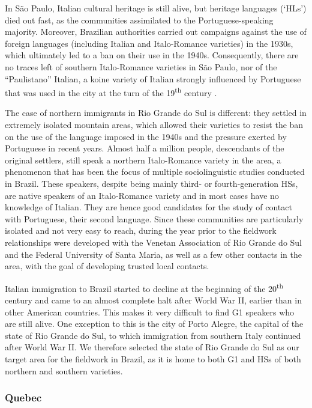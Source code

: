 \documentclass[output=paper,hidelinks]{langscibook}
\begin{document}
In São Paulo, Italian cultural heritage is still alive, but heritage languages (`HLs') died out fast, as the communities assimilated to the Portuguese-speaking majority. Moreover, Brazilian authorities carried out campaigns against the use of foreign languages (including Italian and Italo-Romance varieties) in the 1930s, which ultimately led to a ban on their use in the 1940s. Consequently, there are no traces left of southern Italo-Romance varieties in São Paulo, nor of the ``Paulistano'' Italian, a koine variety of Italian strongly influenced by Portuguese that was used in the city at the turn of the 19\textsuperscript{th} century \citep{Cenni2003}.
	
The case of northern immigrants in Rio Grande do Sul is different: they settled in extremely isolated mountain areas, which allowed their varieties to resist the ban on the use of the language imposed in the 1940s and the pressure exerted by Portuguese in recent years. Almost half a million people, descendants of the original settlers, still speak a northern Italo-Romance variety in the area, a phenomenon that has been the focus of multiple sociolinguistic studies conducted in Brazil. These speakers, despite being mainly third- or fourth-generation HSs, are native speakers of an Italo-Romance variety and in most cases have no knowledge of Italian. They are hence good candidates for the study of contact with Portuguese, their second language. Since these communities are particularly isolated and not very easy to reach, during the year prior to the fieldwork relationships were developed with the Venetan Association of Rio Grande do Sul and the Federal University of Santa Maria, as well as a few other contacts in the area, with the goal of developing trusted local contacts.
	
Italian immigration to Brazil started to decline at the beginning of the 20\textsuperscript{th} century and came to an almost complete halt after World War II, earlier than in other American countries. This makes it very difficult to find G1 speakers who are still alive. One exception to this is the city of Porto Alegre, the capital of the state of Rio Grande do Sul, to which immigration from southern Italy continued after World War II. We therefore selected the state of Rio Grande do Sul as our target area for the fieldwork in Brazil, as it is home to both G1 and HSs of both northern and southern varieties.

\subsubsection{Quebec}
\end{document}
